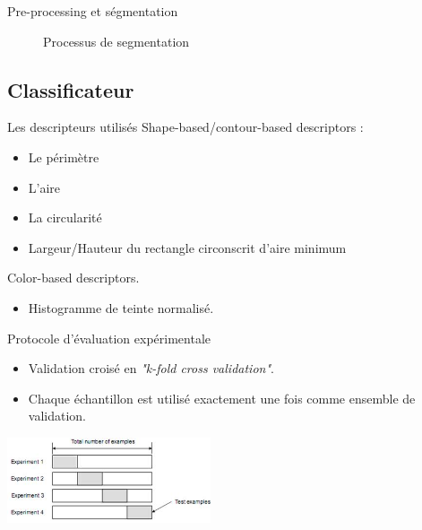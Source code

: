 \documentclass{beamer}
\begin{document}
\begin{frame}{Pre-processing et ségmentation}
\begin{figure}[H]
{        \label{Segmentation_Dilatation}
    }
    \caption{Processus de segmentation}
    \label{segfig}
\end{figure}
  
\end{frame}
\subsection{Classificateur}
\begin{frame}{Les descripteurs utilisés}
Shape-based/contour-based descriptors :
\begin{itemize}
\item Le périmètre
\item L'aire
\item La circularité
\item Largeur/Hauteur du rectangle circonscrit d'aire minimum
\end{itemize}
            
Color-based descriptors.
\begin{itemize}
\item Histogramme de teinte normalisé.
\end{itemize}

\end{frame}
\begin{frame}{Protocole d'évaluation expérimentale}

\begin{itemize}
    \item Validation croisé en \emph{"k-fold cross validation"}.
    \item Chaque échantillon est utilisé exactement une fois comme ensemble de validation.
\end{itemize}


\begin{center}
    \includegraphics[width=6cm]{image002}
\end{center}
  
\end{frame}
\end{document}
